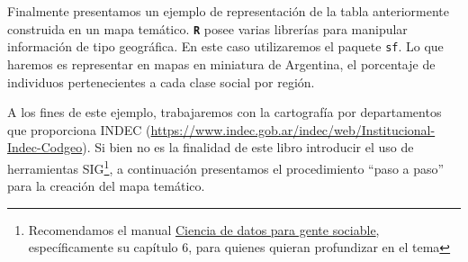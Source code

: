 \documentclass[
]{article}
\newenvironment{Shaded}{\begin{snugshade}}{\end{snugshade}}
\newcommand{\AttributeTok}[1]{\textcolor[rgb]{0.13,0.29,0.53}{#1}}
\newcommand{\CommentTok}[1]{\textcolor[rgb]{0.56,0.35,0.01}{\textit{#1}}}
\newcommand{\DecValTok}[1]{\textcolor[rgb]{0.00,0.00,0.81}{#1}}
\newcommand{\FunctionTok}[1]{\textcolor[rgb]{0.13,0.29,0.53}{\textbf{#1}}}
\newcommand{\NormalTok}[1]{#1}
\newcommand{\OtherTok}[1]{\textcolor[rgb]{0.56,0.35,0.01}{#1}}
\newcommand{\SpecialCharTok}[1]{\textcolor[rgb]{0.81,0.36,0.00}{\textbf{#1}}}
\newcommand{\StringTok}[1]{\textcolor[rgb]{0.31,0.60,0.02}{#1}}
\begin{document}
\begin{Shaded}
\end{Shaded}

Finalmente presentamos un ejemplo de representación de la tabla anteriormente construida en un mapa temático. \textbf{\texttt{R}} posee varias librerías para manipular información de tipo geográfica. En este caso utilizaremos el paquete \texttt{sf}. Lo que haremos es representar en mapas en miniatura de Argentina, el porcentaje de individuos pertenecientes a cada clase social por región.

A los fines de este ejemplo, trabajaremos con la cartografía por departamentos que proporciona INDEC (\url{https://www.indec.gob.ar/indec/web/Institucional-Indec-Codgeo}). Si bien no es la finalidad de este libro introducir el uso de herramientas SIG\footnote{Recomendamos el manual \href{https://bitsandbricks.github.io/ciencia_de_datos_gente_sociable/}{Ciencia de datos para gente sociable}, específicamente su capítulo 6, para quienes quieran profundizar en el tema}, a continuación presentamos el procedimiento ``paso a paso'' para la creación del mapa temático.
\end{document}
